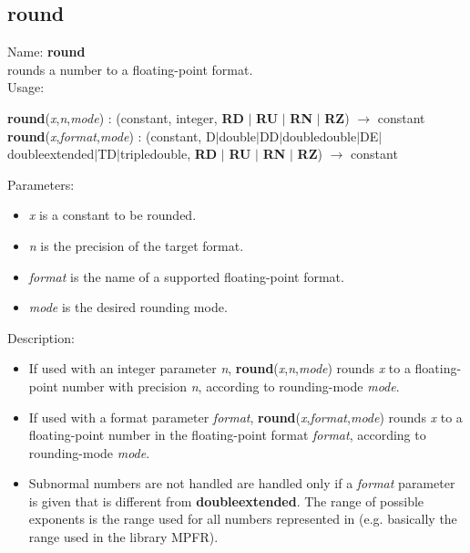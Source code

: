 \subsection{round}
\label{labround}
\noindent Name: \textbf{round}\\
rounds a number to a floating-point format.\\
\noindent Usage: 
\begin{center}
\textbf{round}(\emph{x},\emph{n},\emph{mode}) : (\textsf{constant}, \textsf{integer}, \textbf{RD} $|$ \textbf{RU} $|$ \textbf{RN} $|$ \textbf{RZ}) $\rightarrow$ \textsf{constant}\\
\textbf{round}(\emph{x},\emph{format},\emph{mode}) : (\textsf{constant}, \textsf{D$|$double$|$DD$|$doubledouble$|$DE$|$doubleextended$|$TD$|$tripledouble}, \textbf{RD} $|$ \textbf{RU} $|$ \textbf{RN} $|$ \textbf{RZ}) $\rightarrow$ \textsf{constant}\\
\end{center}
Parameters: 
\begin{itemize}
\item \emph{x} is a constant to be rounded.
\item \emph{n} is the precision of the target format.
\item \emph{format} is the name of a supported floating-point format.
\item \emph{mode} is the desired rounding mode.
\end{itemize}
\noindent Description: \begin{itemize}

\item If used with an integer parameter \emph{n}, \textbf{round}(\emph{x},\emph{n},\emph{mode}) rounds \emph{x} to a floating-point number with 
   precision \emph{n}, according to rounding-mode \emph{mode}. 

\item If used with a format parameter \emph{format}, \textbf{round}(\emph{x},\emph{format},\emph{mode}) rounds \emph{x} to a floating-point number in the 
   floating-point format \emph{format}, according to rounding-mode \emph{mode}. 

\item Subnormal numbers are not handled are handled only if a \emph{format} parameter is given
   that is different from \textbf{doubleextended}. The range of possible exponents is the 
   range used for all numbers represented in \sollya (e.g. basically the range 
   used in the library MPFR). 
\end{itemize}
